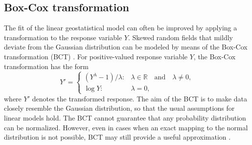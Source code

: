 \documentclass{article}\usepackage[]{graphicx}\usepackage[]{color}
\def\bigr{{\mathbb{R}}}
\def\T{{\footnotesize {^{_{\sf T}}}}}
\begin{document}
\subsection{Box-Cox transformation}
The fit of the linear geostatistical model can often be improved by applying a transformation to the response variable $Y$. Skewed random fields that mildly deviate from the Gaussian distribution can be modeled by means of the Box-Cox transformation (BCT) \cite{box1964analysis}.
For positive-valued response variable $Y$, the Box-Cox transformation has the form
\begin{equation*}
    Y'=
    \begin{cases}
      (Y^\lambda-1)/\lambda: & \lambda \in \bigr \quad \text{and} \quad \lambda \neq  0, \\
      \log Y: & \lambda =0,
    \end{cases}
\end{equation*}
where $Y'$ denotes the transformed response. The aim of the BCT is to make data closely resemble the Gaussian distribution, so that the usual assumptions for linear models hold. The BCT cannot guarantee that any probability distribution can be normalized. However, even in cases when an exact mapping to the normal distribution is not possible, BCT may still provide a useful approximation \cite{hristopulos2020random}.


\end{document}
